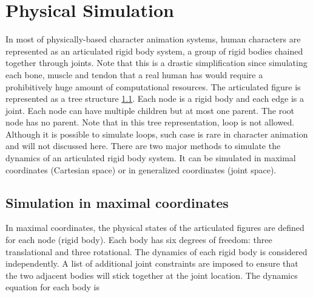 \section{Physical Simulation}
In most of physically-based character animation systems, human characters are represented as an articulated rigid body system, a group of rigid bodies chained together through joints. Note that this is a drastic simplification since simulating each bone, muscle and tendon that a real human has would require a prohibitively huge amount of computational resources. The articulated figure is represented as a tree structure \ref{}. Each node is a rigid body and each edge is a joint. Each node can have multiple children but at most one parent. The root node has no parent. Note that in this tree representation, loop is not allowed. Although it is possible to simulate loops, such case is rare in character animation and will not discussed here. There are two major methods to simulate the dynamics of an articulated rigid body system. It can be simulated in maximal coordinates (Cartesian space) or in generalized coordinates (joint space).



\subsection{Simulation in maximal coordinates}

In maximal coordinates, the physical states of the articulated figures are defined for each node (rigid body). Each body has six degrees of freedom: three translational and three rotational. The dynamics of each rigid body is considered independently. A list of additional joint constraints are imposed to ensure that the two adjacent bodies will stick together at the joint location. The dynamics equation for each body is 

